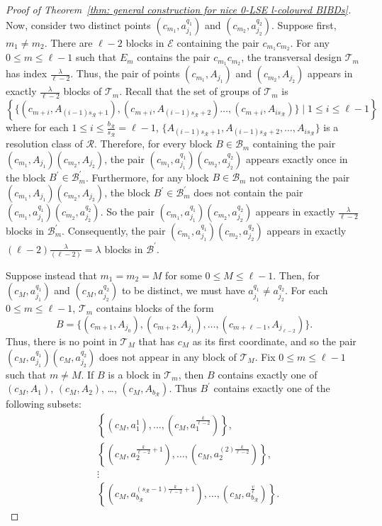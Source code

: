 \documentclass[12pt]{article}
\theoremstyle{definition}
\begin{document}
\begin{proof}[Proof of Theorem~\ref{thm: general construction for nice 0-LSE l-coloured BIBDs}]
    Now, consider two distinct points $(c_{m_1},a_{j_1}^{q_1})$ and $(c_{m_2},a_{j_2}^{q_2})$. Suppose first, $m_1 \neq m_2$. There are $\ell-2$ blocks in $\mathcal{E}$ containing the pair $c_{m_1} c_{m_2}$. For any $0\leq m\leq \ell-1$ such that $E_m$ contains the pair $c_{m_1} c_{m_2}$, the transversal design $\mathcal{T}_m$ has index $\frac{\lambda}{\ell-2}$. Thus, the pair of points $(c_{m_1}, A_{j_1})$ and $(c_{m_2}, A_{j_2})$ appears in exactly $\frac{\lambda}{\ell-2}$ blocks of $\mathcal{T}_m$. Recall that the set of groups of $\mathcal{T}_m$ is \[\left\{ \{(c_{m+i}, A_{(i-1)s_{\mathcal{R}}+1}), (c_{m+i}, A_{(i-1)s_{\mathcal{R}}+2}) \dots, (c_{m+i}, A_{is_{\mathcal{R}}})\} \mid 1\leq i\leq \ell-1 \right\}\] where for each $1\leq i\leq \frac{b_\mathcal{R}}{s_\mathcal{R}} = \ell - 1$, $\{A_{(i-1)s_{\mathcal{R}}+1}, A_{(i-1)s_{\mathcal{R}}+2}, \dots, A_{is_{\mathcal{R}}}\}$ is a resolution class of $\mathcal{R}$. Therefore, for every block $B \in \mathcal{B}_m$ containing the pair $(c_{m_1},A_{j_1})(c_{m_2},A_{j_2})$, the pair $(c_{m_1}, a_{j_1}^{q_1})(c_{m_2}, a_{j_2}^{q_2})$ appears exactly once in the block $B^\prime \in \mathcal{B}_m^\prime$. Furthermore, for any block $B\in \mathcal{B}_m$ not containing the pair $(c_{m_1},A_{j_1})(c_{m_2},A_{j_2})$, the block $B^\prime \in \mathcal{B}_m^\prime$ does not contain the pair $(c_{m_1},a_{j_1}^{q_1}) (c_{m_2},a_{j_2}^{q_2})$. So the pair $(c_{m_1},a_{j_1}^{q_1}) (c_{m_2},a_{j_2}^{q_2})$ appears in exactly $\frac{\lambda}{\ell - 2}$ blocks in $\mathcal{B}_m^\prime$. Consequently, the pair $(c_{m_1},a_{j_1}^{q_1}) (c_{m_2},a_{j_2}^{q_2})$ appears in exactly $(\ell-2) \frac{\lambda}{(\ell-2)} = \lambda$ blocks in $\mathcal{B}^\prime$. 

    Suppose instead that $m_1 = m_2 = M$ for some $0\leq M\leq \ell-1$. Then, for $(c_{M},a_{j_1}^{q_1})$ and $(c_{M},a_{j_2}^{q_2})$ to be distinct, we must have $a_{j_1}^{q_1} \neq a_{j_2}^{q_2}$. For each $0\leq m\leq \ell-1$, $\mathcal{T}_m$ contains blocks of the form \[B = \{(c_{m+1}, A_{j_0}), (c_{m+2}, A_{j_1}), \dots, (c_{m+\ell-1}, A_{j_{\ell-2}})\}.\] Thus, there is no point in $\mathcal{T}_M$ that has $c_M$ as its first coordinate, and so the pair $(c_{M},a_{j_1}^{q_1})(c_{M},a_{j_2}^{q_2})$ does not appear in any block of $\mathcal{T}_M$. Fix $0\leq m\leq \ell - 1$ such that $m\neq M$. If $B$ is a block in $\mathcal{T}_m$, then $B$ contains exactly one of $(c_M, A_1)$, $(c_M, A_2)$, \dots, $(c_M, A_{b_\mathcal{R}})$. Thus $B^\prime$ contains exactly one of the following subsets:
    \begin{align*}
        &\left\{(c_M,a_1^1), \dots, (c_M,a_1^{\frac{k}{\ell-2}})\right\},\\
        &\left\{(c_M,a_2^{\frac{k}{\ell-2} + 1}), \dots, (c_M,a_2^{(2)\frac{k}{\ell-2}})\right\},\\
        &\vdots\\
        &\left\{(c_M,a_{b_{\mathcal{R}}}^{(s_{\mathcal{R}} - 1)\frac{k}{\ell-2} + 1}), \dots, (c_M,a_{b_{\mathcal{R}}}^{\frac{v}{\ell}})\right\}.
    \end{align*}


\end{proof}
\end{document}
